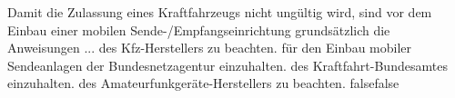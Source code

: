     {Damit die Zulassung eines Kraftfahrzeugs nicht ungültig wird, sind vor dem Einbau einer mobilen Sende-/Empfangseinrichtung grundsätzlich die Anweisungen ...}
    {des Kfz-Herstellers zu beachten.}
    {für den Einbau mobiler Sendeanlagen der Bundesnetzagentur einzuhalten.}
    {des Kraftfahrt-Bundesamtes einzuhalten.}
    {des Amateurfunkgeräte-Herstellers zu beachten.}
    {false}{false}